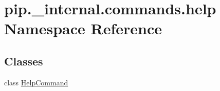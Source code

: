 \hypertarget{namespacepip_1_1__internal_1_1commands_1_1help}{}\section{pip.\+\_\+internal.\+commands.\+help Namespace Reference}
\label{namespacepip_1_1__internal_1_1commands_1_1help}
\subsection*{Classes}
\begin{DoxyCompactItemize}
\item 
class \hyperlink{classpip_1_1__internal_1_1commands_1_1help_1_1HelpCommand}{Help\+Command}
\end{DoxyCompactItemize}
